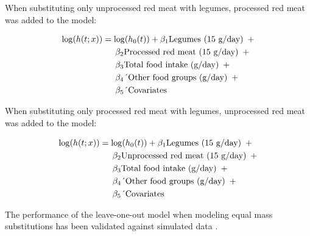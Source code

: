 \documentclass[
]{article}
\begin{document}
\noindent When substituting only unprocessed red meat with legumes,
processed red meat was added to the model:

{\small
\begin{align}
\log(h(t;x)) &= \log(h_0(t)) + \beta_1 \text{Legumes (15 g/day)} \hspace{0.5em} + \nonumber \\
&\quad \hspace{0.5em} \beta_2 \text{Processed red meat (15 g/day)} \hspace{0.5em} + \nonumber \\
&\quad \hspace{0.5em} \beta_3 \text{Total food intake (g/day)} \hspace{0.5em} + \nonumber \\
&\quad \hspace{0.5em} \beta_4 \text{´Other food groups (g/day)} \hspace{0.5em} + \nonumber \\
&\quad \hspace{0.5em} \beta_5 \text{´Covariates}
\end{align}
}

\noindent When substituting only processed red meat with legumes,
unprocessed red meat was added to the model:

{\small
\begin{align}
\log(h(t;x)) &= \log(h_0(t)) + \beta_1 \text{Legumes (15 g/day)} \hspace{0.5em} + \nonumber \\
&\quad \hspace{0.5em} \beta_2 \text{Unprocessed red meat (15 g/day)} \hspace{0.5em} + \nonumber \\
&\quad \hspace{0.5em} \beta_3 \text{Total food intake (g/day)} \hspace{0.5em} + \nonumber \\ 
&\quad \hspace{0.5em} \beta_4 \text{´Other food groups (g/day)} \hspace{0.5em} + \nonumber \\
&\quad \hspace{0.5em} \beta_5 \text{´Covariates}
\end{align}
}

\noindent The performance of the leave-one-out model when modeling equal
mass substitutions has been validated against simulated data
\autocite{Tomova2022}.
\end{document}
